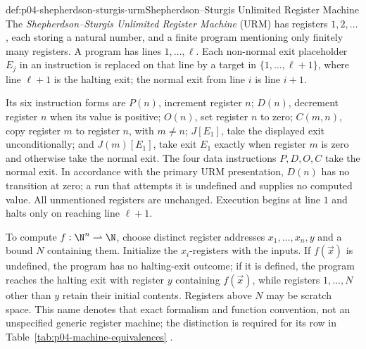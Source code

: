 \begin{hbdefinition}{def:p04-shepherdson-sturgis-urm}{Shepherdson--Sturgis Unlimited Register Machine}
The \emph{Shepherdson--Sturgis Unlimited Register Machine} (URM) has registers
\(1,2,\ldots\), each storing a natural number, and a finite program mentioning
only finitely many registers.  A program has lines \(1,\ldots,\ell\).  Each
non-normal exit placeholder \(E_j\) in an instruction is replaced on that
line by a target in \(\{1,\ldots,\ell+1\}\), where line \(\ell+1\) is the
halting exit; the normal exit from line \(i\) is line \(i+1\).

Its six instruction forms are \(P(n)\), increment register \(n\);
\(D(n)\), decrement register \(n\) when its value is positive;
\(O(n)\), set register \(n\) to zero; \(C(m,n)\), copy register \(m\) to
register \(n\), with \(m\ne n\); \(J[E_1]\), take the displayed exit
unconditionally; and \(J(m)[E_1]\), take exit \(E_1\) exactly when register
\(m\) is zero and otherwise take the normal exit.  The four data instructions
\(P,D,O,C\) take the normal exit.  In accordance with the primary URM
presentation, \(D(n)\) has no transition at zero; a run that attempts it is
undefined and supplies no computed value.  All unmentioned registers are
unchanged.  Execution begins at line \(1\) and halts only on reaching line
\(\ell+1\).

To compute \(f:\N^n\rightharpoonup\N\), choose distinct register addresses
\(x_1,\ldots,x_n,y\) and a bound \(N\) containing them.  Initialize the
\(x_i\)-registers with the inputs.  If \(f(\vec x)\) is undefined, the program
has no halting-exit outcome; if it is defined, the program reaches the halting
exit with register \(y\) containing \(f(\vec x)\), while registers
\(1,\ldots,N\) other than \(y\) retain their initial contents.  Registers
above \(N\) may be scratch space.
This name denotes that exact formalism and function convention, not an
unspecified generic register machine; the distinction is required for its row in
Table~\ref{tab:p04-machine-equivalences} \cite{ShepherdsonSturgis1963}.
\end{hbdefinition}

